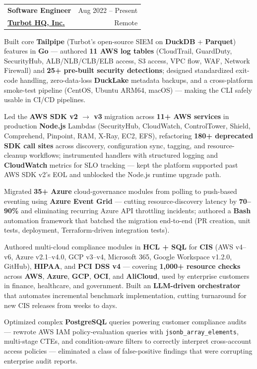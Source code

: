\documentclass[10pt,letterpaper]{article}
\makeatletter
\newcommand{\role}[4]{%
  \vspace{-4pt}%
  \begin{tabular*}{\linewidth}[t]{@{}l@{\extracolsep{\fill}}r@{}}
    {\fontsize{10pt}{11.5pt}\bfseries\color{header}\selectfont #1} & {\color{muted}\small #4} \\[1pt]
    {\fontsize{9.5pt}{11pt}\bfseries\color{primary}\selectfont #2} & {\color{muted}\small #3} \\
  \end{tabular*}%
  \par\vspace{-4pt}%
}
\let\olditemize\itemize
\let\endolditemize\enditemize
\renewenvironment{itemize}
  {\olditemize\setlength{\itemsep}{2pt}\setlength{\parsep}{0pt}\setlength{\topsep}{1pt}\setlength{\partopsep}{0pt}\setlength{\leftmargin}{1.2em}}
  {\endolditemize}
\makeatother
\begin{document}
\role{Software Engineer}{\href{https://turbot.com/}{Turbot HQ, Inc.}}{Remote}{Aug 2022 -- Present}
\begin{itemize}
\item Built core \textbf{Tailpipe} (Turbot's open-source SIEM on \textbf{DuckDB} + \textbf{Parquet}) features in \textbf{Go} --- authored \textbf{11 AWS log tables} (CloudTrail, GuardDuty, SecurityHub, ALB/NLB/CLB/ELB access, S3 access, VPC flow, WAF, Network Firewall) and \textbf{25+ pre-built security detections}; designed standardized exit-code handling, zero-data-loss \textbf{DuckLake} metadata backups, and a cross-platform smoke-test pipeline (CentOS, Ubuntu ARM64, macOS) --- making the CLI safely usable in CI/CD pipelines.

\item Led the \textbf{AWS SDK v2 $\rightarrow$ v3} migration across \textbf{11+ AWS services} in production \textbf{Node.js} Lambdas (SecurityHub, CloudWatch, ControlTower, Shield, Comprehend, Pinpoint, RAM, X-Ray, EC2, EFS), refactoring \textbf{180+ deprecated SDK call sites} across discovery, configuration sync, tagging, and resource-cleanup workflows; instrumented handlers with structured logging and \textbf{CloudWatch} metrics for SLO tracking --- kept the platform supported past AWS SDK v2's EOL and unblocked the Node.js runtime upgrade path.

\item Migrated \textbf{35+ Azure} cloud-governance modules from polling to push-based eventing using \textbf{Azure Event Grid} --- cutting resource-discovery latency by \textbf{70--90\%} and eliminating recurring Azure API throttling incidents; authored a \textbf{Bash} automation framework that batched the migration end-to-end (PR creation, unit tests, deployment, Terraform-driven integration tests).

\item Authored multi-cloud compliance modules in \textbf{HCL + SQL} for \textbf{CIS} (AWS v4--v6, Azure v2.1--v4.0, GCP v3--v4, Microsoft 365, Google Workspace v1.2.0, GitHub), \textbf{HIPAA}, and \textbf{PCI DSS v4} --- covering \textbf{1,000+ resource checks} across \textbf{AWS}, \textbf{Azure}, \textbf{GCP}, \textbf{OCI}, and \textbf{AliCloud}, used by enterprise customers in finance, healthcare, and government. Built an \textbf{LLM-driven orchestrator} that automates incremental benchmark implementation, cutting turnaround for new CIS releases from weeks to days.

\item Optimized complex \textbf{PostgreSQL} queries powering customer compliance audits --- rewrote AWS IAM policy-evaluation queries with \texttt{jsonb\_\allowbreak array\_\allowbreak elements}, multi-stage CTEs, and condition-aware filters to correctly interpret cross-account access policies --- eliminated a class of false-positive findings that were corrupting enterprise audit reports.


\end{itemize}
\end{document}
